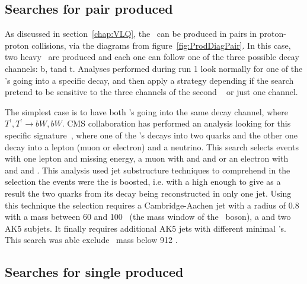 \subsection{Searches for pair produced \Tp}
\label{sec:pairanal}

As discussed in section~\ref{chap:VLQ}, the \Tp~can be produced in pairs in proton-proton collisions, via the diagrams from figure~\ref{fig:ProdDiagPair}. In this case, two heavy \Tp~are produced and each one can follow one of the three possible decay channels: b\W, t\Z and t\Hb. Analyses performed during run 1 look normally for one of the \Tp's going into a specific decay, and then apply a strategy depending if the search pretend to be sensitive to the three channels of the second \Tp~ or just one channel. 

The simplest case is to have both \Tp's going into the same decay channel, where $T^{'},T^{'}\rightarrow bW,bW$. CMS collaboration has performed an analysis looking for this specific signature~\cite{CMS-PAS-B2G-12-017}, where one of the \W's decays into two quarks and the other one decay into a lepton (muon or electron) and a neutrino. This search selects events with one lepton and missing energy, a muon with  and  and  or an electron with  and  and . This analysis used jet substructure techniques to comprehend in the selection the events were the \W is boosted, i.e. with a high \pt enough to give as a result the two quarks from its decay being reconstructed in only one jet. Using this technique the selection requires a Cambridge-Aachen jet with a radius of 0.8 with a mass between 60 and 100 \GeVcc~(the mass window of the \W~boson), a  and two AK5 subjets. It finally requires additional AK5 jets with different minimal \pt's. This search was able exclude \Tp~mass below 912 \GeVcc.



\subsection{Searches for single produced \Tp}
\label{sec:singleanal}


